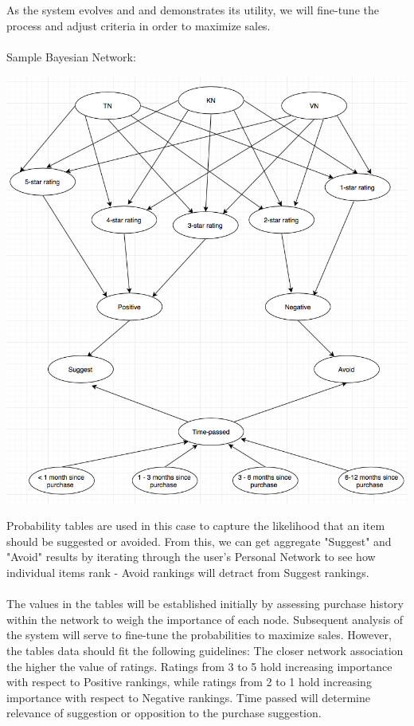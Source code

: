 \documentclass[12pt,a4paper]{article}
\begin{document}
		\\\\
		As the system evolves and and demonstrates its utility, we will fine-tune the process and adjust criteria in order to maximize sales. 
		\\\\
		Sample Bayesian Network:
		\begin{center}
			\includegraphics[width=1\linewidth]{bayes}
		\end{center}
		
		Probability tables are used in this case to capture the likelihood that an item should be suggested or avoided. From this, we can get aggregate "Suggest" and "Avoid" results by iterating through the user's Personal Network to see how individual items rank - Avoid rankings will detract from Suggest rankings.  
		\\\\
		The values in the tables will be established initially by assessing purchase history within the network to weigh the importance of each node. Subsequent analysis of the system will serve to fine-tune the probabilities to maximize sales. However, the tables data should fit the following guidelines: The closer network association the higher the value of ratings. Ratings from 3 to 5 hold increasing importance with respect to Positive rankings, while ratings from 2 to 1 hold increasing importance with respect to Negative rankings.  Time passed will determine relevance of suggestion or opposition to the purchase suggestion.
		
\end{document}
